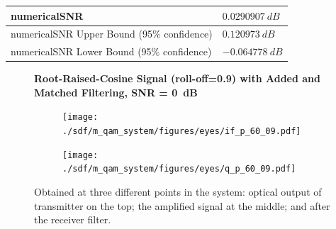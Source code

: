 \begin{refsection}
\begin{table}[H]
\begin{tabular}{|l|l|}
		numericalSNR 		     & $0.0290907~dB$                             					\\ \hline
		numericalSNR Upper Bound (95\% confidence) & $0.120973~dB$                             					\\ \hline
		numericalSNR Lower Bound (95\% confidence) & $-0.064778~dB$                             					\\ \hline
	\end{tabular}
\end{table}
\begin{figure}[H]
		\centering
	\textbf{Root-Raised-Cosine Signal (roll-off=0.9) with Added  and Matched Filtering, SNR = 0~dB}
	\begin{minipage}{\linewidth}
		\centering
	\begin{subfigure}{.45\textwidth}
		\centering
		\texttt{[image: ./sdf/m\_qam\_system/figures/eyes/if\_p\_60\_09.pdf]}
	\end{subfigure}
	\begin{subfigure}{.45\textwidth}
		\centering
		\texttt{[image: ./sdf/m\_qam\_system/figures/eyes/q\_p\_60\_09.pdf]}
	\end{subfigure}
	
	\caption{
		Obtained at three different points in the system: optical output of transmitter on the top;
		the amplified signal at the middle; and
		after the receiver filter.
		\label{fig:eyes_n_rrc_60_09}}
	\end{minipage}
\end{figure}



\end{refsection}
